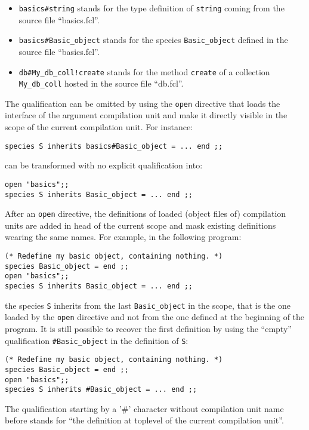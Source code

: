 \begin{itemize}
  \item {\tt basics\#string} stands for the type definition of
    {\tt string} coming from the source file ``basics.fcl''.
  \item {\tt  basics\#Basic\_object} stands for the species
    {\tt Basic\_object} defined in the source file ``basics.fcl''.
  \item {\tt db\#My\_db\_coll!create} stands for the method
    {\tt create} of a collection {\tt My\_db\_coll} hosted in the
    source file ``db.fcl''.
\end{itemize}

The qualification can be omitted by using the {\tt open} directive
that loads the interface of the argument compilation unit and make it
directly visible in the scope of the current compilation unit. For
instance:

{\scriptsize
\begin{lstlisting}
species S inherits basics#Basic_object = ... end ;;
\end{lstlisting}
}
can be transformed with no explicit qualification into:
{\scriptsize
\begin{lstlisting}
open "basics";;
species S inherits Basic_object = ... end ;;
\end{lstlisting}
}

After an {\tt open} directive, the definitions of loaded (object files
of) compilation units are added in head of the current scope and mask
existing definitions wearing the same names. For example, in
the following program: {\scriptsize
\begin{lstlisting}
(* Redefine my basic object, containing nothing. *)
species Basic_object = end ;;
open "basics";;
species S inherits Basic_object = ... end ;;
\end{lstlisting}
}
the species {\tt S} inherits from the last {\tt Basic\_object} in the
scope, that is the one loaded by the {\tt open} directive and not from
the one defined at the beginning of the program. It is still possible
to recover the first definition by using the ``empty'' qualification
{\tt \#Basic\_object} in the definition of {\tt S}:
{\scriptsize
\begin{lstlisting}
(* Redefine my basic object, containing nothing. *)
species Basic_object = end ;;
open "basics";;
species S inherits #Basic_object = ... end ;;
\end{lstlisting}
}

The qualification starting by a '\#' character without compilation
unit name before stands for ``the definition at toplevel of the
current compilation unit''.

